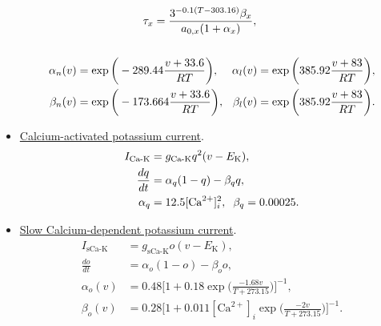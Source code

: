 \documentclass[../main.tex]{subfiles}
\begin{document}
\begin{itemize}
\begin{equation}
\begin{aligned}
            &\hspace{-2.8cm}\tau_x = \displaystyle\frac{3^{-0.1(T-303.16)}\beta_x}{a_{0,x}(1+\alpha_x)},\\
        & \\
        \begin{aligned}
            \alpha_n(v) &= \exp{\bigg( -289.44\displaystyle\frac{v+33.6}{RT}  \bigg)},\\
            \beta_n(v)  &= \exp{\bigg( -173.664\displaystyle\frac{v+33.6}{RT} \bigg)},\hspace{3mm}\\
        \end{aligned}
        &
        \begin{aligned}
            \alpha_l(v) &= \exp{\bigg( 385.92\displaystyle\frac{v+83}{RT}    \bigg)},\\
            \beta_l(v)  &= \exp{\bigg( 385.92\displaystyle\frac{v+83}{RT}    \bigg)}. \\
        \end{aligned}
        \end{aligned}
        \label{eq:cck-KA-current}
        \end{equation}
    \item \underline{Calcium-activated potassium current}.
        \begin{equation}
        \begin{aligned}
            I_{\text{Ca-K}} &= g_{\text{Ca-K}}q^2(v-E_{\text{K}}), \\
            \displaystyle\frac{dq}{dt} &= \alpha_q(1-q)-\beta_qq,\\
            \alpha_q &= 12.5[\text{Ca}^{2+}]_i^2,\hspace{0.2cm}
            \beta_q = 0.00025.
            \label{eq:cck-calcium-current}
        \end{aligned}
        \end{equation}
    \item \underline{Slow Calcium-dependent potassium current}.
        \begin{equation}
        \begin{aligned}
            I_{\text{sCa-K}} &= g_{\text{sCa-K}}o(v-E_{\text{K}}),\\
           \displaystyle\frac{do}{dt} &= \alpha_o(1-o)-\beta_oo,\\
           \alpha_o(v) &= 0.48\Bigg[1+0.18\exp{\bigg( \displaystyle\frac{-1.68v}{T+273.15}  \bigg)} \Bigg]^{-1},\\ 
           \beta_o(v) &= 0.28\Bigg[1+ 0.011[\text{Ca}^{2+}]_i\exp{\bigg( \displaystyle\frac{-2v}{T+273.15}\bigg)}\Bigg]^{-1}.

\end{aligned}
\end{equation}
\end{itemize}
\end{document}
